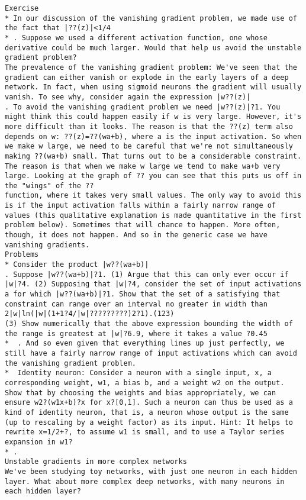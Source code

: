 \begin{lstlisting}
Exercise
* In our discussion of the vanishing gradient problem, we made use of the fact that |??(z)|<1/4
* . Suppose we used a different activation function, one whose derivative could be much larger. Would that help us avoid the unstable gradient problem? 
The prevalence of the vanishing gradient problem: We've seen that the gradient can either vanish or explode in the early layers of a deep network. In fact, when using sigmoid neurons the gradient will usually vanish. To see why, consider again the expression |w??(z)|
. To avoid the vanishing gradient problem we need |w??(z)|?1. You might think this could happen easily if w is very large. However, it's more difficult than it looks. The reason is that the ??(z) term also depends on w: ??(z)=??(wa+b), where a is the input activation. So when we make w large, we need to be careful that we're not simultaneously making ??(wa+b) small. That turns out to be a considerable constraint. The reason is that when we make w large we tend to make wa+b very large. Looking at the graph of ?? you can see that this puts us off in the "wings" of the ??
function, where it takes very small values. The only way to avoid this is if the input activation falls within a fairly narrow range of values (this qualitative explanation is made quantitative in the first problem below). Sometimes that will chance to happen. More often, though, it does not happen. And so in the generic case we have vanishing gradients.
Problems
* Consider the product |w??(wa+b)|
. Suppose |w??(wa+b)|?1. (1) Argue that this can only ever occur if |w|?4. (2) Supposing that |w|?4, consider the set of input activations a for which |w??(wa+b)|?1. Show that the set of a satisfying that constraint can range over an interval no greater in width than 
2|w|ln(|w|(1+1?4/|w|?????????)2?1).(123)
(3) Show numerically that the above expression bounding the width of the range is greatest at |w|?6.9, where it takes a value ?0.45
*  . And so even given that everything lines up just perfectly, we still have a fairly narrow range of input activations which can avoid the vanishing gradient problem.
*  Identity neuron: Consider a neuron with a single input, x, a corresponding weight, w1, a bias b, and a weight w2 on the output. Show that by choosing the weights and bias appropriately, we can ensure w2?(w1x+b)?x for x?[0,1]. Such a neuron can thus be used as a kind of identity neuron, that is, a neuron whose output is the same (up to rescaling by a weight factor) as its input. Hint: It helps to rewrite x=1/2+?, to assume w1 is small, and to use a Taylor series expansion in w1?
* . 
Unstable gradients in more complex networks
We've been studying toy networks, with just one neuron in each hidden layer. What about more complex deep networks, with many neurons in each hidden layer?


\end{lstlisting}
